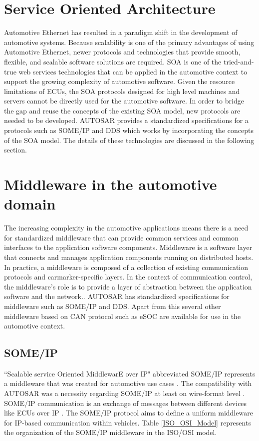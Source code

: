 \section{Service Oriented Architecture}
Automotive Ethernet has resulted in a paradigm shift in the development of automotive systems. Because scalability is one of the primary advantages of using Automotive Ethernet, newer protocols and technologies that provide smooth, flexible, and scalable software solutions are required. SOA is one of the tried-and-true web services technologies that can be applied in the automotive context to support the growing complexity of automotive software. Given the resource limitations of ECUs, the SOA protocols designed for high level machines and servers cannot be directly used for the automotive software. In order to bridge the gap and reuse the concepts of the existing SOA model, new protocols are needed to be developed. AUTOSAR provides a standardized specifications for a protocols such as SOME/IP and DDS which works by incorporating the concepts of the SOA model. The details of these technologies are discussed in the following section.   

\section{Middleware in the automotive domain}
The increasing complexity in the automotive applications means there is a need for standardized middleware that can provide common services and common interfaces to the application software components\cite{b_TrendsInACS}. Middleware is a software layer that connects and manages application components running on distributed hosts\cite{b_middleware}. In practice, a middleware is composed of a collection of existing communication protocols and carmarker-specific layers\cite{b_TrendsInACS}. In the context of communication control, the middleware's role is to provide a layer of abstraction between the application software and the network.\cite{b1.4}. AUTOSAR has standardized specifications for middleware such as SOME/IP and DDS. Apart from this several other middleware based on CAN protocol such as eSOC\cite{b_TrendsInACS} are available for use in the automotive context. 

\subsection{SOME/IP}
``Scalable service Oriented MiddlewarE over IP" abbreviated SOME/IP represents a middleware that was created for automotive use cases \cite{b1.1}. The compatibility with AUTOSAR was a necessity regarding SOME/IP at least on wire-format level \cite{b1.1}. SOME/IP communication is an exchange of messages between different devices like ECUs over IP \cite{b1.1}. The SOME/IP protocol aims to define a uniform middleware for IP-based communication within vehicles. Table \ref{ISO_OSI_Model} represents the organization of the SOME/IP middleware in the ISO/OSI model.
\par  

